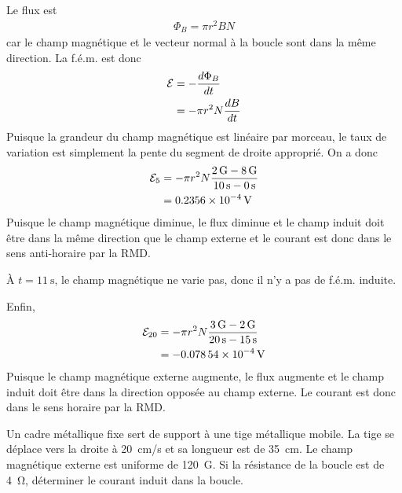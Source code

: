 \begin{reponsebox}
  Le flux est
  \begin{align*}
    \Phi_B = \pi r^2 B N
  \end{align*}
  car le champ magnétique et le vecteur normal à la boucle sont dans la même
  direction. La f.é.m. est donc
  \begin{align*}
    \mathcal{E} &= -\frac{d \Phi_B}{dt}  \\
         &= -\pi r^2 N \frac{dB}{dt}
  \end{align*}
  Puisque la grandeur du champ magnétique est linéaire par morceau, le taux de
  variation est simplement la pente du segment de droite approprié. On a donc
  \begin{align*}
    \mathcal{E}_5 &= -\pi r^2 N \frac{\SI{2}{G} - \SI{8}{G}}{\SI{10}{\second} -
              \SI{0}{\second}}  \\
           &= \SI{0.2356e-4}{\volt}
  \end{align*}
  Puisque le champ magnétique diminue, le flux diminue et le champ induit doit
  être dans la même direction que le champ externe et le courant est donc dans
  le sens anti-horaire par la RMD.


  À $t = \SI{11}{\second}$, le champ magnétique ne varie pas, donc il n'y a pas
  de f.é.m. induite.

  Enfin,
  \begin{align*}
    \mathcal{E}_{20} &= -\pi r^2 N \frac{\SI{3}{G} - \SI{2}{G}}{\SI{20}{\second} -
              \SI{15}{\second}}  \\
           &= \SI{-0.07854e-4}{\volt}
  \end{align*}
  Puisque le champ magnétique externe augmente, le flux augmente et le champ
  induit doit être dans la direction opposée au champ externe. Le courant est
  donc dans le sens horaire par la RMD. 

\end{reponsebox}



\begin{diapobox}

  Un cadre métallique fixe sert de support à une tige métallique mobile. La tige
  se déplace vers la droite à \SI{20}{cm/s} et sa longueur est de \SI{35}{cm}. Le
  champ magnétique externe est uniforme de \SI{120}{G}.
  Si la résistance de la boucle est de \SI{4}{\ohm}, déterminer le courant induit
  dans la boucle.

  \begin{center}
  \end{center}
\end{diapobox}

